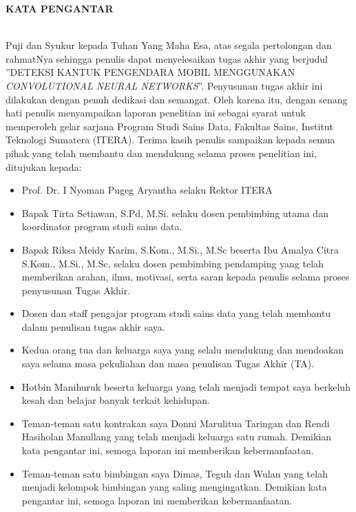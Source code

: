 \clearpage

\normalsize \bfseries \centering \MakeUppercase{Kata Pengantar}
% 
\thispagestyle{fancy}
\fancyhf{}
\fancyhead[R]{\thepage}
\\[2\baselineskip]

\normalsize \normalfont \justifying
    Puji dan Syukur kepada Tuhan Yang Maha Esa, atas segala pertolongan dan rahmatNya sehingga penulis dapat menyelesaikan tugas akhir yang berjudul ”DETEKSI KANTUK PENGENDARA MOBIL MENGGUNAKAN\textit{ CONVOLUTIONAL NEURAL NETWORKS}”.
    Penyusunan tugas akhir ini dilakukan dengan penuh dedikasi dan semangat. Oleh
    karena itu, dengan senang hati penulis menyampaikan laporan penelitian ini sebagai syarat untuk memperoleh gelar sarjana Program Studi Sains Data, Fakultas
    Sains, Institut Teknologi Sumatera (ITERA). Terima kasih penulis sampaikan kepada semua pihak yang telah membantu dan mendukung selama proses penelitian
    ini, ditujukan kepada:

        \begin{itemize}
        
        \item Prof. Dr. I Nyoman Pugeg Aryantha selaku Rektor ITERA
        \item Bapak Tirta Setiawan, S.Pd, M.Si. selaku dosen pembimbing utama dan koordinator program studi sains data.
        
        \item Bapak Riksa Meidy Karim, S.Kom., M.Si., M.Sc beserta Ibu Amalya Citra S.Kom., M.Si., M.Sc, selaku dosen pembimbing pendamping yang telah memberikan arahan, ilmu, motivasi, serta saran kepada penulis selama proses penyusunan Tugas Akhir.
        
        \item Dosen dan staff pengajar program studi sains data yang telah membantu dalam penulisan tugas akhir saya.
        
        \item Kedua orang tua dan keluarga saya yang selalu mendukung dan mendoakan saya selama masa pekuliahan dan masa penulisan Tugas Akhir (TA).

        \item Hotbin Manihuruk beserta keluarga yang telah menjadi tempat saya berkeluh kesah dan belajar banyak terkait kehidupan.
        
        \item Teman-teman satu kontrakan saya Donni Marulitua Taringan dan Rendi Hasiholan Manullang yang telah menjadi keluarga satu rumah.
        Demikian kata pengantar ini, semoga laporan ini memberikan kebermanfaatan.

        \item Teman-teman satu bimbingan saya Dimas, Teguh dan Wulan yang telah menjadi kelompok bimbingan yang saling mengingatkan.
        Demikian kata pengantar ini, semoga laporan ini memberikan kebermanfaatan.
        
        \end{itemize}


\clearpage
